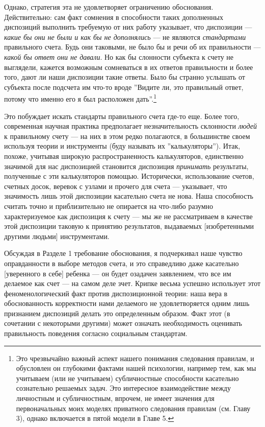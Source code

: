 \documentclass[11pt]{book}
\begin{document}
Однако, стратегия эта не удовлетворяет ограничению обоснования. Действительно: сам факт сомнения в способности таких дополненных диспозиций выполнить требуемую от них работу указывает, что диспозиции --- \textit{какие бы они не были и как бы не дополнялись} --- не являются \textit{стандартами} правильного счета. Будь они таковыми, не было бы и речи об их правильности --- \textit{какой бы ответ они не давали}. Но как бы слонности субъекта к счету не выглядели, кажется возможным сомневаться в их ответов правильности и более того, дают ли наши диспозиции такие ответы. Было бы странно услышать от субъекта после подсчета им что-то вроде ''Видите ли, это правильный ответ, потому что именно его я был расположен дать''.\footnote{Это чрезвычайно важный аспект нашего понимания следования правилам, и обусловлен он глубокими фактами нашей психологии, например тем, как мы учитываем (или не учитываем) субличностные способности касательно сознательно решаемых задач. Это интересное взаимодействие между личностным и субличностным, впрочем, не имеет значения для первоначальных моих моделях приватного следования правилам (см. Главу 3), однако включается в пятой модели в Главе 5.}

Это побуждает искать стандарты правильного счета где-то еще. Более того, современная научная практика предполагает незначительность склонности \textit{людей} к правильному счету --- на них в этом редко полагаются, в большинстве своем используя теории и инструменты (буду называть их ''калькуляторы''). Итак, похоже, учитывая широкую распространенность калькуляторов, единственно значимой для нас диспозицией становится диспозиция \textit{принимать} результаты, полученные с эти калькуляторов помощью. Исторически, использование счетов, счетных досок, веревок с узлами и прочего для счета --- указывает, что значимость лишь этой диспозиции касательно счета не нова. Наша способность считать точно и приблизительно не опирается на что-либо разумно характеризуемое как диспозиция к счету --- мы же не рассматриваем в качестве этой диспозиции таковую к принятию результатов, выдаваемых [изобретенными другими людьми] инструментами.

Обсуждая в Разделе 1 требование обоснования, я подчеркивал наше чувство оправданности в выборе методов счета, и это справедливо даже касательно [уверенного в себе] ребенка --- он будет озадачен заявлением, что все им делаемое как счет --- на самом деле зчет. Крипке весьма успешно использует этот феноменологический факт против диспозиционной теории: наша вера в обоснованность корректности нами делаемого не удовлетворяется одним лишь признанием диспозиций делать это определенным образом. Факт этот (в сочетании с некоторыми другими) может означать необходимость оценивать правильность поведения согласно социальным стандартам.
\end{document}
